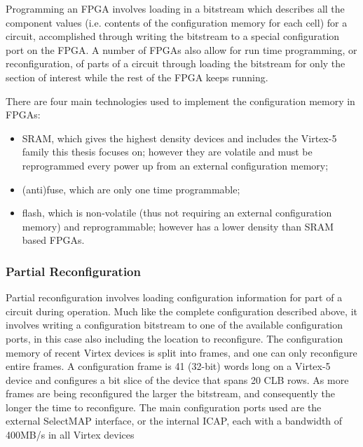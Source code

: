 \documentclass[12pt,final,oneside]{dwThesis} %
\begin{document}
Programming an \ac{FPGA} involves loading in a bitstream which describes all the component values (i.e. contents of the configuration memory for each cell) for a circuit, accomplished through writing the bitstream to a special configuration port on the \ac{FPGA}. A number of \acp{FPGA} also allow for run time programming, or reconfiguration, of parts of a circuit through loading the bitstream for only the section of interest while the rest of the \ac{FPGA} keeps running.

\newpage{}
There are four main technologies used to implement the configuration memory in \acp{FPGA}:
\begin{itemize}
\item \ac{SRAM}, which gives the highest density devices and includes the Virtex-5 family this thesis focuses on; however they are volatile and must be reprogrammed every power up from an external configuration memory;
\item (anti)fuse, which are only one time programmable;
\item flash, which is non-volatile (thus not requiring an external configuration memory) and reprogrammable; however has a lower density than \ac{SRAM} based \acp{FPGA}\cite{FPGAArch}.
\end{itemize}
\subsubsection{Partial Reconfiguration}
Partial reconfiguration involves loading configuration information for part of a circuit during operation. Much like the complete configuration described above, it involves writing a configuration bitstream to one of the available configuration ports, in this case also including the location to reconfigure. The configuration memory of recent Virtex devices is split into frames, and one can only reconfigure entire frames. A configuration frame is 41 (32-bit) words long on a Virtex-5 device and configures a bit slice of the device that spans 20 \ac{CLB} rows. As more frames are being reconfigured the larger the bitstream, and consequently the longer the time to reconfigure. The main configuration ports used are the external SelectMAP interface, or the internal \ac{ICAP}, each with a bandwidth of 400MB/s in all Virtex devices \cite{XCell33,DiesselChange}
\end{document}

